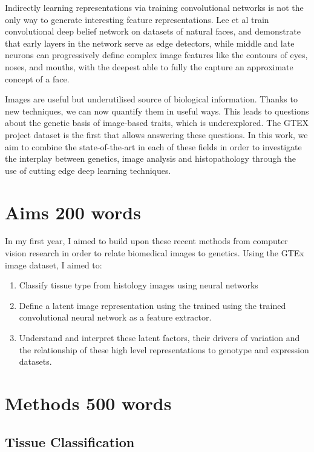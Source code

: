 \documentclass[graybox]{svmult}
\begin{document}
Indirectly learning representations via training convolutional networks is not the only way to generate interesting feature representations. Lee et al \cite{scalable-unsupervised-learning} train convolutional deep belief network on datasets of natural faces, and demonstrate that early layers in the network serve as edge detectors, while middle and late neurons can progressively define complex image features like the contours of eyes, noses, and mouths, with the deepest able to fully the capture an approximate concept of a face.

Images are useful but underutilised source of biological information. Thanks to new techniques, we can now quantify them in useful ways. This leads to questions about the genetic basis of image-based traits, which is underexplored. The GTEX project dataset is the first that allows answering these questions. In this work, we aim to combine the state-of-the-art in each of these fields in order to investigate the interplay between genetics, image analysis and histopathology through the use of cutting edge deep learning techniques.


\section{Aims 200 words}
In my first year, I aimed to build upon these recent methods from computer vision research in order to relate biomedical images to genetics. Using the GTEx image dataset, I aimed to:
\begin{enumerate}
 \item Classify tissue type from histology images using neural networks
 \item Define a latent image representation using the trained using the trained convolutional neural network as a feature extractor.
 \item Understand and interpret these latent factors, their drivers of variation and the relationship of these high level representations to genotype and expression datasets.
\end{enumerate}
\label{sec:2}

\section{Methods 500 words}



\subsection{Tissue Classification}
\end{document}
